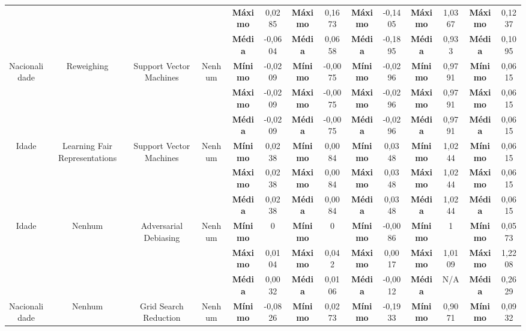 \documentclass[portugues]{ic-tese}
\begin{document}
\begin{table}[H]
\begin{center}
{\begin{tabular}{c|c|c|c|c|c|c|c|c|c|c|c|c|c}
             & & & & \textbf{Máximo} & 0,0285 & \textbf{Máximo} & 0,1673 & \textbf{Máximo} & -0,1405 & \textbf{Máximo} & 1,0367 & \textbf{Máximo} & 0,1237 \\
             & & & & \textbf{Média} & -0,0604 & \textbf{Média} & 0,0658 & \textbf{Média} & -0,1895 & \textbf{Média} & 0,933 & \textbf{Média} & 0,1095 \\
            \hline
            \multirow{3}{*}{Nacionalidade} & \multirow{3}{*}{Reweighing} & \multirow{3}{*}{Support Vector Machines} & \multirow{3}{*}{Nenhum} & \textbf{Mínimo} & -0,0209 & \textbf{Mínimo} & -0,0075 & \textbf{Mínimo} & -0,0296 & \textbf{Mínimo} & 0,9791 & \textbf{Mínimo} & 0,0615 \\
             & & & & \textbf{Máximo} & -0,0209 & \textbf{Máximo} & -0,0075 & \textbf{Máximo} & -0,0296 & \textbf{Máximo} & 0,9791 & \textbf{Máximo} & 0,0615 \\
             & & & & \textbf{Média} & -0,0209 & \textbf{Média} & -0,0075 & \textbf{Média} & -0,0296 & \textbf{Média} & 0,9791 & \textbf{Média} & 0,0615 \\
            \hline
            \multirow{3}{*}{Idade} & \multirow{3}{*}{Learning Fair Representations} & \multirow{3}{*}{Support Vector Machines} & \multirow{3}{*}{Nenhum} & \textbf{Mínimo} & 0,0238 & \textbf{Mínimo} & 0,0084 & \textbf{Mínimo} & 0,0348 & \textbf{Mínimo} & 1,0244 & \textbf{Mínimo} & 0,0615 \\
             & & & & \textbf{Máximo} & 0,0238 & \textbf{Máximo} & 0,0084 & \textbf{Máximo} & 0,0348 & \textbf{Máximo} & 1,0244 & \textbf{Máximo} & 0,0615 \\
             & & & & \textbf{Média} & 0,0238 & \textbf{Média} & 0,0084 & \textbf{Média} & 0,0348 & \textbf{Média} & 1,0244 & \textbf{Média} & 0,0615 \\
            \hline
            \multirow{3}{*}{Idade} & \multirow{3}{*}{Nenhum} & \multirow{3}{*}{Adversarial Debiasing} & \multirow{3}{*}{Nenhum} & \textbf{Mínimo} & 0 & \textbf{Mínimo} & 0 & \textbf{Mínimo} & -0,0086 & \textbf{Mínimo} & 1 & \textbf{Mínimo} & 0,0573 \\
             & & & & \textbf{Máximo} & 0,0104 & \textbf{Máximo} & 0,042 & \textbf{Máximo} & 0,0017 & \textbf{Máximo} & 1,0109 & \textbf{Máximo} & 1,2208 \\
             & & & & \textbf{Média} & 0,0032 & \textbf{Média} & 0,0106 & \textbf{Média} & -0,0012 & \textbf{Média} & N/A & \textbf{Média} & 0,2629 \\
            \hline
            \multirow{3}{*}{Nacionalidade} & \multirow{3}{*}{Nenhum} & \multirow{3}{*}{Grid Search Reduction} & \multirow{3}{*}{Nenhum} & \textbf{Mínimo} & -0,0826 & \textbf{Mínimo} & 0,0273 & \textbf{Mínimo} & -0,1933 & \textbf{Mínimo} & 0,9071 & \textbf{Mínimo} & 0,0932 \\

\end{tabular}}
\end{center}
\end{table}
\end{document}
